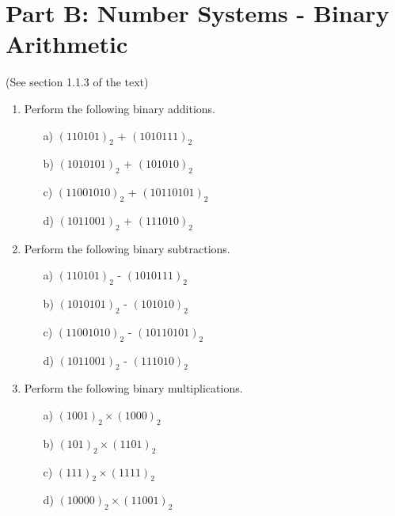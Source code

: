 \documentclass[]{report}
\begin{document}

\section*{Part B: Number Systems - Binary Arithmetic}
(See section 1.1.3 of the text)
\begin{enumerate}
\item Perform the following binary additions.
\begin{multicols}{2}
\begin{itemize}
\item[a)] $(110101)_{2}$ + $(1010111)_{2}$
\item[b)] $(1010101)_{2}$ + $(101010)_{2}$
\item[c)] $(11001010)_{2}$ + $(10110101)_{2}$
\item[d)] $(1011001)_{2}$ + $(111010)_{2}$
\end{itemize}
\end{multicols}

\item Perform the following binary subtractions.
\begin{multicols}{2}
\begin{itemize}
\item[a)] $(110101)_{2}$ - $(1010111)_{2}$
\item[b)] $(1010101)_{2}$ - $(101010)_{2}$
\item[c)] $(11001010)_{2}$ - $(10110101)_{2}$
\item[d)] $(1011001)_{2}$ - $(111010)_{2}$
\end{itemize}
\end{multicols}


\item Perform the following binary multiplications.
\begin{multicols}{2}
\begin{itemize}
\item[a)] $(1001)_{2}\times( 1000)_{2}$  %
\item[b)] $(101)_{2}\times(1101)_{2}$ %
\item[c)] $(111)_{2}\times(1111)_{2}$ %
\item[d)] $(10000)_{2}\times(11001)_{2}$    %
\end{itemize}
\end{multicols}
\end{enumerate}
\newpage
\end{document}

